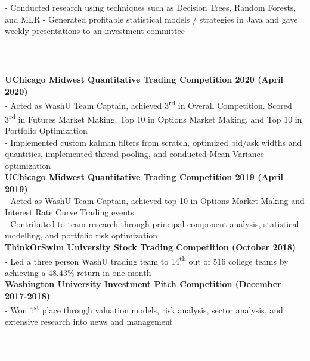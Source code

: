 \documentclass[11pt]{article}
\begin{document}
\begin{titlepage}
\begin{addmargin}[1em]{0em}
				- Conducted research using techniques such as Decision Trees, Random Forests, and MLR\newline
				- Generated profitable statistical models / strategies in Java and gave weekly presentations to an investment committee\newline
		\end{addmargin}
		\vspace{-10pt}
		\noindent
		\\\rule{\textwidth}{0.4pt}
		\begin{addmargin}[1em]{0em}
    		\textbf{UChicago Midwest Quantitative Trading Competition 2020 \hfill (April 2020)}\\
				- Acted as WashU Team Captain, achieved 3\textsuperscript{rd} in Overall Competition. Scored 3\textsuperscript{rd} in Futures Market Making, Top 10 in Options Market Making, and Top 10 in Portfolio Optimization\\
				- Implemented custom kalman filters from scratch, optimized bid/ask widths and quantities, implemented thread pooling, and conducted Mean-Variance optimization\\
			\textbf{UChicago Midwest Quantitative Trading Competition 2019 \hfill (April 2019)}\\
				- Acted as WashU Team Captain, achieved top 10 in Options Market Making and Interest Rate Curve Trading events\\
				- Contributed to team research through principal component analysis, statistical modelling, and portfolio risk optimization\\
			\textbf{ThinkOrSwim University Stock Trading Competition \hfill (October 2018)}\\
				- Led a three person WashU trading team to 14\textsuperscript{th} out of 516 college teams by achieving a 48.43\% return in one month\\
           \textbf{Washington University Investment Pitch Competition \hfill (December 2017-2018)}\\
				- Won 1\textsuperscript{st} place through valuation models, risk analysis, sector analysis, and extensive research into news and management\\
		\end{addmargin}
		\vspace{-10pt}
		\noindent
		\\\rule{\textwidth}{0.4pt}

\end{titlepage}
\end{document}
